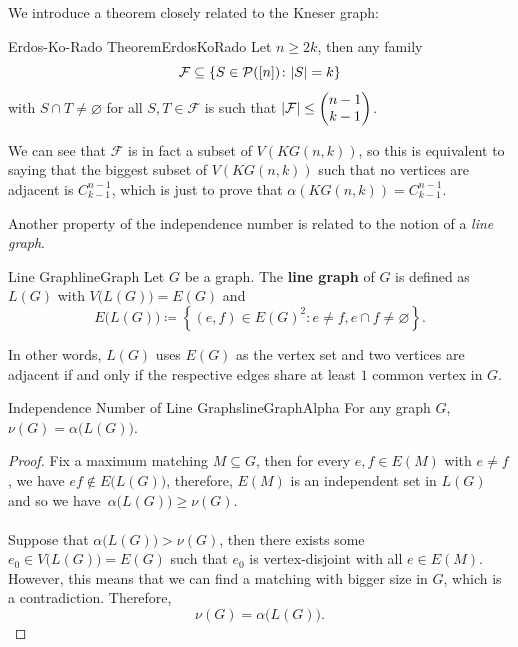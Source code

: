 \documentclass[math]{amznotes}
\theoremstyle{remark}
\newcommand{\0}{\mathbf{0}}
\newcommand{\1}{\mathbf{1}}
\begin{document}
We introduce a theorem closely related to the Kneser graph:
\begin{thmbox}{Erdos-Ko-Rado Theorem}{ErdosKoRado}
    Let $n \geq 2k$, then any family
    \begin{equation*}
        \mathcal{F} \subseteq \left\{S \in \mathcal{P}([n]) \colon {\left\lvert {S} \right\rvert} = k\right\}
    \end{equation*}
    with $S \cap T \neq \varnothing$ for all $S, T \in \mathcal{F}$ is such that ${\left\lvert {\mathcal{F}} \right\rvert} \leq \begin{pmatrix}
        n - 1 \\
        k - 1
    \end{pmatrix}$.
\end{thmbox}
We can see that $\mathcal{F}$ is in fact a subset of $V(KG(n, k))$, so this is equivalent to saying that the biggest subset of $V(KG(n, k))$ such that no vertices are adjacent is $C^{n - 1}_{k - 1}$, which is just to prove that $\alpha(KG(n, k)) = C^{n - 1}_{k - 1}$.

Another property of the independence number is related to the notion of a \textit{line graph}.
\begin{dfnbox}{Line Graph}{lineGraph}
    Let $G$ be a graph. The {\color{red} \textbf{line graph}} of $G$ is defined as $L(G)$ with $V\bigl(L(G)\bigr) = E(G)$ and
    \begin{equation*}
        E\bigl(L(G)\bigr) \coloneqq \left\{(e, f) \in E(G)^2 \colon e \neq f, e \cap f \neq \varnothing\right\}.
    \end{equation*}
\end{dfnbox}
In other words, $L(G)$ uses $E(G)$ as the vertex set and two vertices are adjacent if and only if the respective edges share at least $1$ common vertex in $G$.
\begin{probox}{Independence Number of Line Graphs}{lineGraphAlpha}
    For any graph $G$, $\nu(G) = \alpha\bigl(L(G)\bigr)$.
    \tcblower
    \begin{proof}
        Fix a maximum matching $M \subseteq G$, then for every $e, f \in E(M)$ with $e \neq f$, we have $ef \notin E\bigl(L(G)\bigr)$, therefore, $E(M)$ is an independent set in $L(G)$ and so we have~$\alpha\bigl(L(G)\bigr) \geq \nu(G)$.
        \\\\
        Suppose that $\alpha\bigl(L(G)\bigr) > \nu(G)$, then there exists some $e_0 \in V\bigl(L(G)\bigr) = E(G)$ such that $e_0$ is vertex-disjoint with all $e \in E(M)$. However, this means that we can find a matching with bigger size in $G$, which is a contradiction. Therefore, 
        \begin{equation*}
            \nu(G) = \alpha\bigl(L(G)\bigr).
        \end{equation*}
    \end{proof}
\end{probox}
\end{document}
